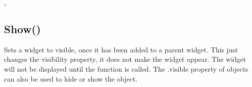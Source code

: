\documentclass[letterpaper,10pt,english]{sphinxmanual}
\begin{document}
\sphinxAtStartPar
{}, 

\ignorespaces 

\subsection{Show()}
\label{\detokenize{reference/peblobjects:show}}\label{\detokenize{reference/peblobjects:index-56}}
\sphinxAtStartPar
{}

\sphinxAtStartPar
{}

\sphinxAtStartPar
Sets a widget to visible, once it has been added to   a parent widget.  This just changes the visibility property, it does   not make the widget appear.  The widget will not be displayed until   the  function is called.  The .visible property of objects can also be used to hide or show the object.

\sphinxAtStartPar
{}

\begin{sphinxVerbatim}[commandchars=\\\{\}]
\end{sphinxVerbatim}

\sphinxAtStartPar
{}

\begin{sphinxVerbatim}[commandchars=\\\{\}]
\end{sphinxVerbatim}
\end{document}
